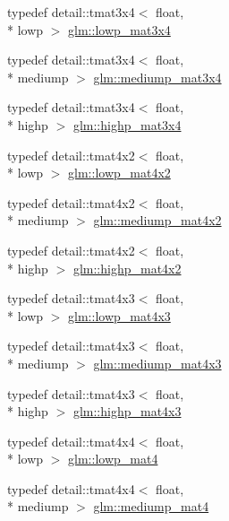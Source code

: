 \begin{DoxyCompactItemize}
\item 
typedef detail\-::tmat3x4$<$ float, \\*
lowp $>$ \hyperlink{group__core__precision_ga9cea06e7378fe59abf95c1f56edc4320}{glm\-::lowp\-\_\-mat3x4}
\item 
typedef detail\-::tmat3x4$<$ float, \\*
mediump $>$ \hyperlink{group__core__precision_ga5654236019c6a732844da31534a3cf28}{glm\-::mediump\-\_\-mat3x4}
\item 
typedef detail\-::tmat3x4$<$ float, \\*
highp $>$ \hyperlink{group__core__precision_gabaf9c8dd35db715b1093042703f879d0}{glm\-::highp\-\_\-mat3x4}
\item 
typedef detail\-::tmat4x2$<$ float, \\*
lowp $>$ \hyperlink{group__core__precision_ga2cfe24ae14da17f3510acfc3d03e05a5}{glm\-::lowp\-\_\-mat4x2}
\item 
typedef detail\-::tmat4x2$<$ float, \\*
mediump $>$ \hyperlink{group__core__precision_ga5ade2a6a65653683f76988c45da39f15}{glm\-::mediump\-\_\-mat4x2}
\item 
typedef detail\-::tmat4x2$<$ float, \\*
highp $>$ \hyperlink{group__core__precision_gadf9c4a7947c2b0a79f52cc86a860f270}{glm\-::highp\-\_\-mat4x2}
\item 
typedef detail\-::tmat4x3$<$ float, \\*
lowp $>$ \hyperlink{group__core__precision_gada92d0baf15002240dd6f638c57f9fec}{glm\-::lowp\-\_\-mat4x3}
\item 
typedef detail\-::tmat4x3$<$ float, \\*
mediump $>$ \hyperlink{group__core__precision_ga445d8aac3a5227af2d1e98d5c2f74d03}{glm\-::mediump\-\_\-mat4x3}
\item 
typedef detail\-::tmat4x3$<$ float, \\*
highp $>$ \hyperlink{group__core__precision_gab8dfe989c5100c35ab5dec0e94f59d2a}{glm\-::highp\-\_\-mat4x3}
\item 
typedef detail\-::tmat4x4$<$ float, \\*
lowp $>$ \hyperlink{group__core__precision_ga8f6fef75ce51e9d6db7971478ad1f1c2}{glm\-::lowp\-\_\-mat4}
\item 
typedef detail\-::tmat4x4$<$ float, \\*
mediump $>$ \hyperlink{group__core__precision_gaf3de9a0400cf707d3c159f32902b92db}{glm\-::mediump\-\_\-mat4}
\item 

\end{DoxyCompactItemize}
